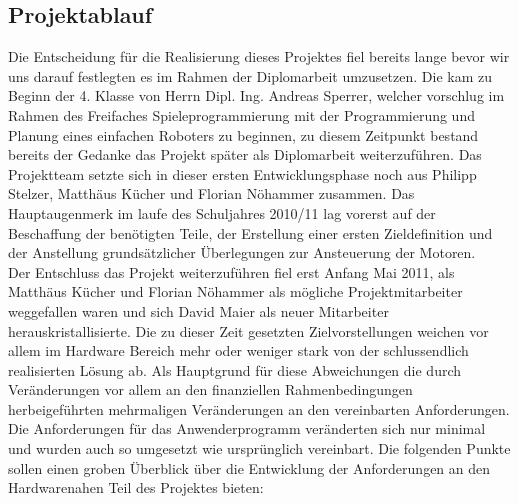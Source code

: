 \subsection{Projektablauf}
Die Entscheidung für die Realisierung dieses Projektes fiel bereits lange bevor wir uns darauf festlegten es im Rahmen der Diplomarbeit umzusetzen. Die kam zu Beginn der 4. Klasse von Herrn Dipl. Ing. Andreas Sperrer, welcher vorschlug im Rahmen des Freifaches Spieleprogrammierung mit der Programmierung und Planung eines einfachen Roboters zu beginnen, zu diesem Zeitpunkt bestand bereits der Gedanke das Projekt später als Diplomarbeit weiterzuführen. Das Projektteam setzte sich in dieser ersten Entwicklungsphase noch aus Philipp Stelzer, Matthäus Kücher und Florian Nöhammer zusammen. Das Hauptaugenmerk im laufe des Schuljahres 2010/11 lag vorerst auf der Beschaffung der benötigten Teile, der Erstellung einer ersten Zieldefinition und der Anstellung grundsätzlicher Überlegungen zur Ansteuerung der Motoren.\\
Der Entschluss das Projekt weiterzuführen fiel erst Anfang Mai 2011, als Matthäus Kücher und Florian Nöhammer als mögliche Projektmitarbeiter weggefallen waren und sich David Maier als neuer Mitarbeiter herauskristallisierte. 
Die zu dieser Zeit gesetzten Zielvorstellungen weichen vor allem im Hardware Bereich mehr oder weniger stark von der schlussendlich realisierten Lösung ab. Als Hauptgrund für diese Abweichungen die durch Veränderungen vor allem an den finanziellen Rahmenbedingungen herbeigeführten mehrmaligen Veränderungen an den vereinbarten Anforderungen. Die Anforderungen für das Anwenderprogramm veränderten sich nur minimal und wurden auch so umgesetzt wie ursprünglich vereinbart.
Die folgenden Punkte sollen einen groben Überblick über die Entwicklung der Anforderungen an den Hardwarenahen Teil des Projektes bieten:\\
